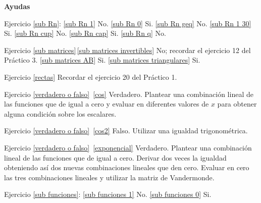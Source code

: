 \begin{enumerate}[resume, topsep=6pt, itemsep=.4cm]
\begin{enumerate}
    \end{enumerate}


\end{enumerate}

%
%
%
%
%
%         
%

\textbf{Ayudas}

Ejercicio \ref{sub Rn}: 
\ref{sub Rn 1} No. \ref{sub Rn 0} Si. \ref{sub Rn geq} No. \ref{sub Rn 1 30} Si. \ref{sub Rn cup} No. \ref{sub Rn cap} Si. \ref{sub Rn q} No.


Ejercicio \ref{sub matrices}\,\ref{sub matrices invertibles} No; recordar el ejercicio 12 del Práctico 3. \ref{sub matrices AB} Si. \ref{sub matrices triangulares} Si.

Ejercicio \ref{rectas} Recordar el ejercicio 20 del Práctico 1.

Ejercicio \ref{verdadero o falso}\, \ref{cos} Verdadero. Plantear una combinación lineal de las funciones que de igual a cero y evaluar en diferentes valores de $x$ para obtener alguna condición sobre los escalares.

Ejercicio \ref{verdadero o falso}\, \ref{cos2} Falso. Utilizar una igualdad trigonométrica.

Ejercicio \ref{verdadero o falso}\, \ref{exponencial} Verdadero. Plantear una combinación lineal de las funciones que de igual a cero. Derivar dos veces la igualdad obteniendo así dos nuevas combinaciones lineales que den cero. Evaluar en cero las tres combinaciones lineales y utilizar la matriz de Vandermonde.

Ejercicio \ref{sub funciones}: \ref{sub funciones 1} No. \ref{sub funciones 0} Si.

